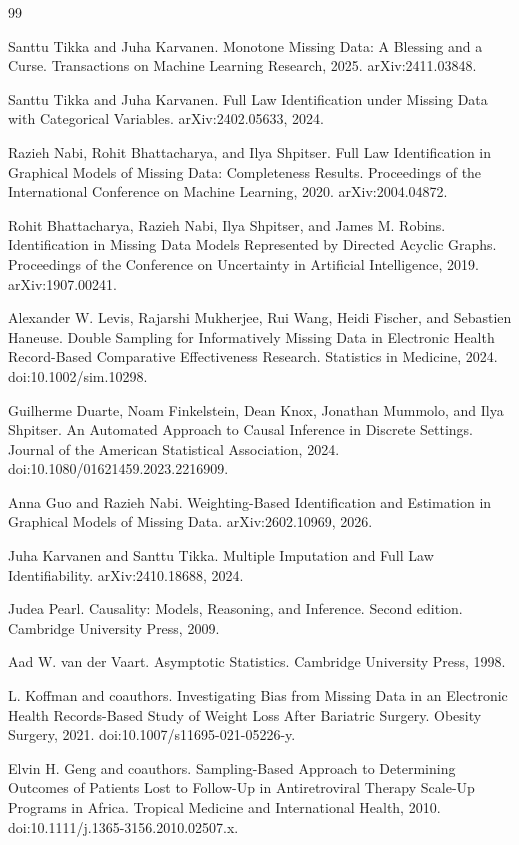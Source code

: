 \documentclass{article}
\begin{document}
\begin{thebibliography}{99}

   Santtu Tikka and Juha Karvanen. Monotone Missing Data: A Blessing and a Curse. Transactions on Machine Learning Research, 2025. arXiv:2411.03848.

   Santtu Tikka and Juha Karvanen. Full Law Identification under Missing Data with Categorical Variables. arXiv:2402.05633, 2024.

   Razieh Nabi, Rohit Bhattacharya, and Ilya Shpitser. Full Law Identification in Graphical Models of Missing Data: Completeness Results. Proceedings of the International Conference on Machine Learning, 2020. arXiv:2004.04872.

   Rohit Bhattacharya, Razieh Nabi, Ilya Shpitser, and James M. Robins. Identification in Missing Data Models Represented by Directed Acyclic Graphs. Proceedings of the Conference on Uncertainty in Artificial Intelligence, 2019. arXiv:1907.00241.

   Alexander W. Levis, Rajarshi Mukherjee, Rui Wang, Heidi Fischer, and Sebastien Haneuse. Double Sampling for Informatively Missing Data in Electronic Health Record-Based Comparative Effectiveness Research. Statistics in Medicine, 2024. doi:10.1002/sim.10298.

   Guilherme Duarte, Noam Finkelstein, Dean Knox, Jonathan Mummolo, and Ilya Shpitser. An Automated Approach to Causal Inference in Discrete Settings. Journal of the American Statistical Association, 2024. doi:10.1080/01621459.2023.2216909.

   Anna Guo and Razieh Nabi. Weighting-Based Identification and Estimation in Graphical Models of Missing Data. arXiv:2602.10969, 2026.

   Juha Karvanen and Santtu Tikka. Multiple Imputation and Full Law Identifiability. arXiv:2410.18688, 2024.

   Judea Pearl. Causality: Models, Reasoning, and Inference. Second edition. Cambridge University Press, 2009.

   Aad W. van der Vaart. Asymptotic Statistics. Cambridge University Press, 1998.

   L. Koffman and coauthors. Investigating Bias from Missing Data in an Electronic Health Records-Based Study of Weight Loss After Bariatric Surgery. Obesity Surgery, 2021. doi:10.1007/s11695-021-05226-y.

   Elvin H. Geng and coauthors. Sampling-Based Approach to Determining Outcomes of Patients Lost to Follow-Up in Antiretroviral Therapy Scale-Up Programs in Africa. Tropical Medicine and International Health, 2010. doi:10.1111/j.1365-3156.2010.02507.x.

\end{thebibliography}
\end{document}
